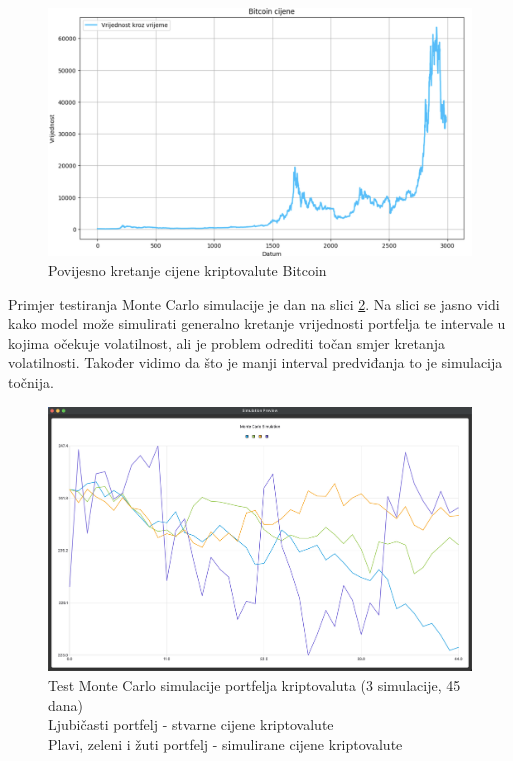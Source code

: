 \documentclass[zavrsnirad, upload]{fer}
\begin{document}
\begin{figure}[H]
    \centering
    \includegraphics[width=1.0\textwidth]{Figures/BTC_hist.png}
    \caption{Povijesno kretanje cijene kriptovalute Bitcoin}
    \label{fig:BTC_hist}
\end{figure}

Primjer testiranja Monte Carlo simulacije je dan na slici
\ref{fig:monte_carlo_test}.
Na slici se jasno vidi kako model može simulirati generalno kretanje
vrijednosti portfelja te intervale u kojima očekuje volatilnost, ali
je problem odrediti točan smjer kretanja volatilnosti. Također vidimo
da što je manji interval predviđanja to je simulacija točnija.
\begin{figure}[H]
    \centering
    \includegraphics[width=1.0\textwidth]{Figures/monte_carlo_test.png}
    \caption{Test Monte Carlo simulacije portfelja kriptovaluta (3
    simulacije, 45 dana)\\
    Ljubičasti portfelj - stvarne cijene kriptovalute\\
    Plavi, zeleni i žuti portfelj - simulirane cijene kriptovalute
    }
    \label{fig:monte_carlo_test}
\end{figure}
\end{document}
